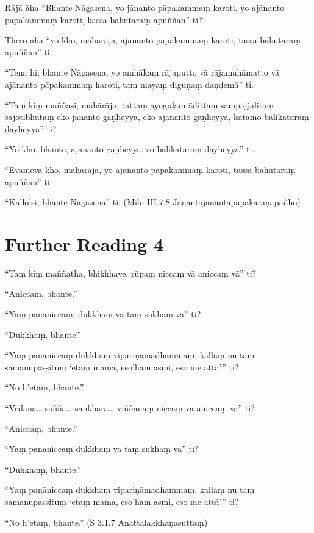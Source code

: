 Rājā āha “Bhante Nāgasena, yo jānanto pāpakammaṃ karoti, yo ajānanto pāpakammaṃ karoti, kassa bahutaraṃ apuññan” ti?

Thero āha “yo kho, mahārāja, ajānanto pāpakammaṃ karoti, tassa bahutaraṃ apuññan” ti.

“Tena hi, bhante Nāgasena, yo amhākaṃ rājaputto vā rājamahāmatto vā ajānanto pāpakammaṃ karoti, taṃ mayaṃ diguṇaṃ daṇḍemā” ti.

“Taṃ kiṃ maññasi, mahārāja, tattaṃ ayoguḷaṃ ādittaṃ sampajjalitaṃ sajotibhūtaṃ eko jānanto gaṇheyya, eko ajānanto gaṇheyya, katamo balikataraṃ ḍayheyyā” ti?

“Yo kho, bhante, ajānanto gaṇheyya, so balikataraṃ ḍayheyyā” ti.

“Evameva kho, mahārāja, yo ajānanto pāpakammaṃ karoti, tassa bahutaraṃ apuññan” ti.

“Kallo’si, bhante Nāgasenā” ti. \hfill(Miln III.7.8 Jānantājānantapāpakaraṇapañho)

\section*{Further Reading 4}

“Taṃ kiṃ maññatha, bhikkhave, rūpaṃ niccaṃ vā aniccaṃ vā” ti?

“Aniccaṃ, bhante.”

“Yaṃ panāniccaṃ, dukkhaṃ vā taṃ sukhaṃ vā” ti?

“Dukkhaṃ, bhante.”

“Yaṃ panāniccaṃ dukkhaṃ vipariṇāmadhammaṃ, kallaṃ nu taṃ samanupassituṃ ‘etaṃ mama, eso’ham asmi, eso me attā’” ti?

“No h’etaṃ, bhante.”

“Vedanā… saññā… saṅkhārā… viññāṇaṃ niccaṃ vā aniccaṃ vā” ti?

“Aniccaṃ, bhante.”

“Yaṃ panāniccaṃ dukkhaṃ vā taṃ sukhaṃ vā” ti?

“Dukkhaṃ, bhante.”

“Yaṃ panāniccaṃ dukkhaṃ vipariṇāmadhammaṃ, kallaṃ nu taṃ samanupassituṃ ‘etaṃ mama, eso’ham asmi, eso me attā’” ti?

“No h’etaṃ, bhante.” \hfill(S 3.1.7 Anattalakkhaṇasuttaṃ)